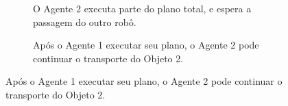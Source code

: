 \begin{figure}[htpb]
  \vspace{0.3cm}
  \begin{subfigure}[t]{0.45\textwidth}
    \centering
    \caption{O Agente 2 executa parte do plano total, e espera a passagem do outro robô.}
  \end{subfigure}
  \hspace{0.2cm}
  \begin{subfigure}[t]{0.45\textwidth}
    \centering
    \caption{Após o Agente 1 executar seu plano, o Agente 2 pode continuar o transporte do Objeto 2.}
  \end{subfigure}


\end{figure}
